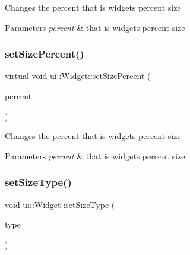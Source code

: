 Changes the percent that is widget\textquotesingle{}s percent size


\begin{DoxyParams}{Parameters}
{\em percent} & that is widget\textquotesingle{}s percent size \\
\hline
\end{DoxyParams}
\mbox{\label{classui_1_1Widget_a6992d881e606beb32dd95af57bd7f1f8}} 
\subsubsection{\texorpdfstring{set\+Size\+Percent()}{setSizePercent()}\hspace{0.1cm}{\footnotesize\ttfamily [2/2]}}
{\footnotesize\ttfamily virtual void ui\+::\+Widget\+::set\+Size\+Percent (\begin{DoxyParamCaption}\item[{const \hyperlink{classVec2}{Vec2} \&}]{percent }\end{DoxyParamCaption})\hspace{0.3cm}{\ttfamily [virtual]}}

Changes the percent that is widget\textquotesingle{}s percent size


\begin{DoxyParams}{Parameters}
{\em percent} & that is widget\textquotesingle{}s percent size \\
\hline
\end{DoxyParams}
\mbox{\label{classui_1_1Widget_a0227da458f10e9f3bcb4e2137a0a05e5}} 
\subsubsection{\texorpdfstring{set\+Size\+Type()}{setSizeType()}\hspace{0.1cm}{\footnotesize\ttfamily [1/2]}}
{\footnotesize\ttfamily void ui\+::\+Widget\+::set\+Size\+Type (\begin{DoxyParamCaption}\item[{\hyperlink{classui_1_1Widget_ab7035fc10a00c756523be6bc57cf801c}{Size\+Type}}]{type }\end{DoxyParamCaption})}

